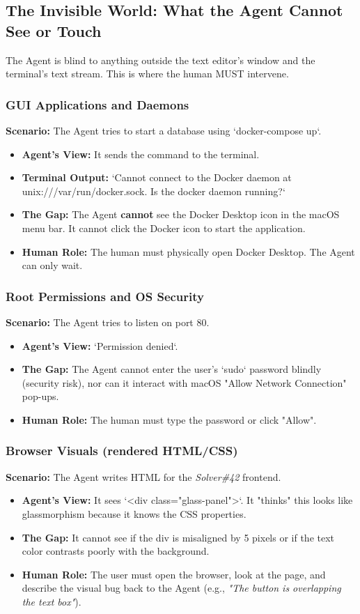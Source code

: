 \documentclass[12pt, a4paper]{article}
\begin{document}
\subsection{The Invisible World: What the Agent Cannot See or Touch}

The Agent is blind to anything outside the text editor's window and the terminal's text stream. This is where the human MUST intervene.

\subsubsection{GUI Applications and Daemons}
\textbf{Scenario:} The Agent tries to start a database using `docker-compose up`.
\begin{itemize}
    \item \textbf{Agent's View:} It sends the command to the terminal.
    \item \textbf{Terminal Output:} `Cannot connect to the Docker daemon at unix:///var/run/docker.sock. Is the docker daemon running?`
    \item \textbf{The Gap:} The Agent \textbf{cannot} see the Docker Desktop icon in the macOS menu bar. It cannot click the Docker icon to start the application.
    \item \textbf{Human Role:} The human must physically open Docker Desktop. The Agent can only wait.
\end{itemize}

\subsubsection{Root Permissions and OS Security}
\textbf{Scenario:} The Agent tries to listen on port 80.
\begin{itemize}
    \item \textbf{Agent's View:} `Permission denied`.
    \item \textbf{The Gap:} The Agent cannot enter the user's `sudo` password blindly (security risk), nor can it interact with macOS "Allow Network Connection" pop-ups.
    \item \textbf{Human Role:} The human must type the password or click "Allow".
\end{itemize}

\subsubsection{Browser Visuals (rendered HTML/CSS)}
\textbf{Scenario:} The Agent writes HTML for the \textit{Solver\#42} frontend.
\begin{itemize}
    \item \textbf{Agent's View:} It sees `<div class="glass-panel">`. It "thinks" this looks like glassmorphism because it knows the CSS properties.
    \item \textbf{The Gap:} It cannot see if the div is misaligned by 5 pixels or if the text color contrasts poorly with the background.
    \item \textbf{Human Role:} The user must open the browser, look at the page, and describe the visual bug back to the Agent (e.g., \textit{"The button is overlapping the text box"}).
\end{itemize}
\end{document}
